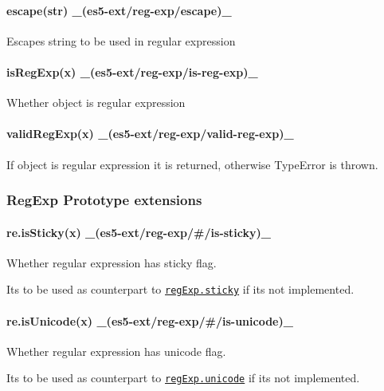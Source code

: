 \paragraph*{escape(str) \+\_\+(es5-\/ext/reg-\/exp/escape)\+\_\+}

Escapes string to be used in regular expression

\paragraph*{is\+Reg\+Exp(x) \+\_\+(es5-\/ext/reg-\/exp/is-\/reg-\/exp)\+\_\+}

Whether object is regular expression

\paragraph*{valid\+Reg\+Exp(x) \+\_\+(es5-\/ext/reg-\/exp/valid-\/reg-\/exp)\+\_\+}

If object is regular expression it is returned, otherwise Type\+Error is thrown.

\subsubsection*{Reg\+Exp Prototype extensions}

\paragraph*{re.\+is\+Sticky(x) \+\_\+(es5-\/ext/reg-\/exp/\#/is-\/sticky)\+\_\+}

Whether regular expression has {\ttfamily sticky} flag.

It\textquotesingle{}s to be used as counterpart to \href{http://people.mozilla.org/~jorendorff/es6-draft.html#sec-get-regexp.prototype.sticky}{\tt reg\+Exp.\+sticky} if it\textquotesingle{}s not implemented.

\paragraph*{re.\+is\+Unicode(x) \+\_\+(es5-\/ext/reg-\/exp/\#/is-\/unicode)\+\_\+}

Whether regular expression has {\ttfamily unicode} flag.

It\textquotesingle{}s to be used as counterpart to \href{http://people.mozilla.org/~jorendorff/es6-draft.html#sec-get-regexp.prototype.unicode}{\tt reg\+Exp.\+unicode} if it\textquotesingle{}s not implemented.

